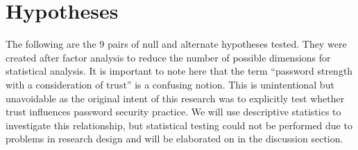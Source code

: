 \documentclass[letterpaper, 10 pt, conference]{ieeeconf}  %
\begin{document}
\section{Hypotheses}

The following are the 9 pairs of null and alternate hypotheses tested. They were created after factor analysis to reduce the number of possible dimensions for statistical analysis. It is important to note here that the term “password strength with a consideration of trust” is a confusing notion. This is unintentional but unavoidable as the original intent of this research was to explicitly test whether trust influences password security practice. We will use descriptive statistics to investigate this relationship, but statistical testing could not be performed due to problems in research design and will be elaborated on in the discussion section.
\end{document}
